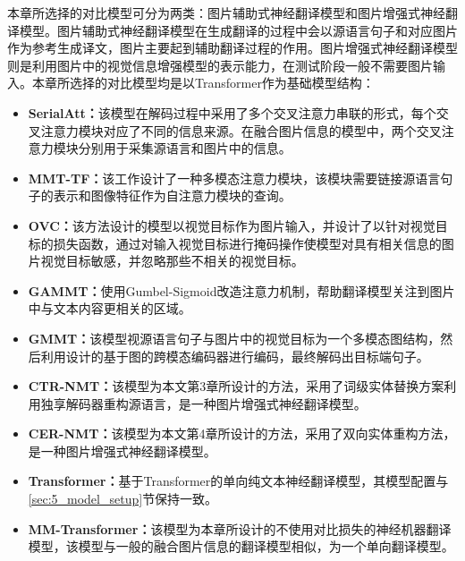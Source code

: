 本章所选择的对比模型可分为两类：图片辅助式神经翻译模型和图片增强式神经翻译模型。图片辅助式神经翻译模型在生成翻译的过程中会以源语言句子和对应图片作为参考生成译文，图片主要起到辅助翻译过程的作用。图片增强式神经翻译模型则是利用图片中的视觉信息增强模型的表示能力，在测试阶段一般不需要图片输入。本章所选择的对比模型均是以Transformer作为基础模型结构：
\begin{itemize}
    \item \textbf{SerialAtt：}该模型在解码过程中采用了多个交叉注意力串联的形式，每个交叉注意力模块对应了不同的信息来源。在融合图片信息的模型中，两个交叉注意力模块分别用于采集源语言和图片中的信息。
    \item \textbf{MMT-TF：}该工作设计了一种多模态注意力模块，该模块需要链接源语言句子的表示和图像特征作为自注意力模块的查询。
    \item \textbf{OVC：}该方法设计的模型以视觉目标作为图片输入，并设计了以针对视觉目标的损失函数，通过对输入视觉目标进行掩码操作使模型对具有相关信息的图片视觉目标敏感，并忽略那些不相关的视觉目标。
    \item \textbf{GAMMT：}使用Gumbel-Sigmoid改造注意力机制，帮助翻译模型关注到图片中与文本内容更相关的区域。
    \item \textbf{GMMT：}该模型视源语言句子与图片中的视觉目标为一个多模态图结构，然后利用设计的基于图的跨模态编码器进行编码，最终解码出目标端句子。
    \item \textbf{CTR-NMT：}该模型为本文第3章所设计的方法，采用了词级实体替换方案利用独享解码器重构源语言，是一种图片增强式神经翻译模型。
    \item \textbf{CER-NMT：}该模型为本文第4章所设计的方法，采用了双向实体重构方法，是一种图片增强式神经翻译模型。
    \item \textbf{Transformer：}基于Transformer的单向纯文本神经翻译模型，其模型配置与\ref{sec:5_model_setup}节保持一致。
    \item \textbf{MM-Transformer：}该模型为本章所设计的不使用对比损失的神经机器翻译模型，该模型与一般的融合图片信息的翻译模型相似，为一个单向翻译模型。
    
\end{itemize}
